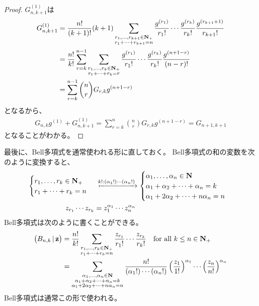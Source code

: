 {\begin{proof}
		$G_{n,k+1}^{(1)}$は
		\begin{equation*}\begin{split}
			G_{n,k+1}^{(1)} &= \frac{n!}{(k+1)!}(k+1)
				\sum_{\substack{r_1,\dots,r_{k+1}\in\mathbf{N}_+\\r_1+\cdots+r_{k+1}=n}}
				\frac{g^{(r_1)}}{r_1!}\cdots\frac{g^{(r_k)}}{r_k!}
				\frac{g^{(r_{k+1}+1)}}{r_{k+1}!} \\
			&= \frac{n!}{k!} \sum_{r=k}^{n-1}
				\sum_{\substack{r_1,\dots,r_k\in\mathbf{N}_+\\r_1+\cdots+r_k=r}}
				\frac{g^{(r_1)}}{r_1!}\cdots\frac{g^{(r_k)}}{r_k!}
				\frac{g^{(n+1-r)}}{(n-r)!} \\
			&= \sum_{r=k}^{n-1}\binom{n}{r} G_{r,k} g^{(n+1-r)}
		\end{split}\end{equation*}
		となるから、
		\begin{equation*}\begin{split}
			G_{n,k}g^{(1)} + G_{n,k+1}^{(1)}
			= \sum_{r=k}^n\binom{n}{r} G_{r,k} g^{(n+1-r)} = G_{n+1,k+1}
		\end{split}\end{equation*}
		となることがわかる。
	\end{proof} %

	最後に、Bell多項式を通常使われる形に直しておく。
	Bell多項式の和の変数を次のように変換すると、
	\begin{equation*}\begin{split}
		\begin{cases}
				r_1,\dots,r_k\in\sizen_+ \\
				r_1+\cdots+r_k=n
		\end{cases} &\xmapsto{k!:(\alpha_1!)\cdots(\alpha_n!)} \begin{cases}
			\alpha_1,\dots,\alpha_n\in\sizen \\
			\alpha_1 + \alpha_2 +\cdots+ \alpha_n = k \\
			\alpha_1 + 2\alpha_2 +\cdots+ n\alpha_n = n \\
		\end{cases} \\
		z_{r_1}\cdots z_{r_k} &= z_1^{\alpha_1}\cdots z_n^{\alpha_n}
	\end{split}\end{equation*}
	Bell多項式は次のように書くことができる。
	\begin{equation*}\begin{split}
		\mathinner{\bigl({B_{n,k}\,\vert\,\mathbf{z}}\bigr)} &= \frac{n!}{k!}
			\sum_{\substack{r_1,\dots,r_k\in\mathbf{N}_+\\r_1+\cdots+r_k=n}} 
			\frac{z_{r_1}}{r_1!}\cdots\frac{z_{r_k}}{r_k!}
			\quad\text{for all } k\le n\in\mathbf{N}_+ \\
		&= \sum_{\substack{\alpha_1,\dots,\alpha_n\in\mathbf{N} \\
			\alpha_1+\alpha_2+\cdots+\alpha_n=k \\
			\alpha_1+2\alpha_2+\cdots+n\alpha_n=n}} 
			\frac{n!}{(\alpha_1!)\cdots(\alpha_n!)}
			\mathinner{\left({\frac{z_1}{1!}}\right)}^{\alpha_1}\cdots\mathinner{\left({\frac{z_n}{n!}}\right)}^{\alpha_n}
	\end{split}\end{equation*}
	Bell多項式は通常この形で使われる。
}
